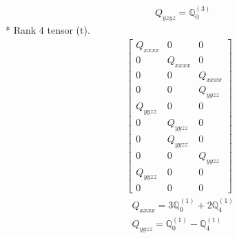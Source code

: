 \documentclass[fleqn,8pt,landscape]{jsarticle}
\begin{document}
\begin{align*}
& Q_{yzyz} = \mathbb{Q}_{0}^{(3)}
\end{align*}
* Rank 4 tensor (t).
\begin{align*}
\begin{bmatrix} Q_{xxxx} & 0 & 0 \\ 0 & Q_{xxxx} & 0 \\ 0 & 0 & Q_{xxxx} \\ 0 & 0 & Q_{yyzz} \\ Q_{yyzz} & 0 & 0 \\ 0 & Q_{yyzz} & 0 \\ 0 & Q_{yyzz} & 0 \\ 0 & 0 & Q_{yyzz} \\ Q_{yyzz} & 0 & 0 \\ 0 & 0 & 0 \end{bmatrix}
\end{align*}
\begin{align*}
& Q_{xxxx} = 3 \mathbb{Q}_{0}^{(1)} + 2 \mathbb{Q}_{4}^{(1)} \\
& Q_{yyzz} = \mathbb{Q}_{0}^{(1)} - \mathbb{Q}_{4}^{(1)}
\end{align*}
\end{document}
